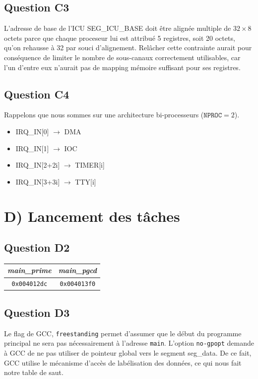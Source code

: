 \documentclass[10pt]{article}
\begin{document}
\subsection{Question C3}
L'adresse de base de l'ICU SEG\_ICU\_BASE doit être alignée multiple de $32
\times 8$ octets parce que chaque proceseur lui est attribué 5 registres, soit
20 octets, qu'on rehausse à 32 par souci d'alignement. Relâcher cette
contrainte aurait pour conséquence de limiter le nombre de sous-canaux
correctement utilisables, car l'un d'entre eux n'aurait pas de mapping mémoire
suffisant pour ses registres.

\subsection{Question C4}
Rappelons que nous sommes sur une architecture bi-processeurs ($\texttt{NPROC}
=2$).
\begin{itemize}
  \item IRQ\_IN[0] $\rightarrow$ DMA
  \item IRQ\_IN[1] $\rightarrow$ IOC
  \item IRQ\_IN[2+2i] $\rightarrow$ TIMER[i]
  \item IRQ\_IN[3+3i] $\rightarrow$ TTY[i]
\end{itemize}

\section{D) Lancement des tâches}

\subsection{Question D2}
\begin{center}
  \begin{tabular}{|c|c|}
    \hline
    {\it main\_prime} & {\it main\_pgcd} \\ \hline
    \texttt{0x004012dc} & \texttt{0x004013f0} \\ \hline
  \end{tabular}
\end{center}

\subsection{Question D3}
Le flag de GCC, \texttt{freestanding} permet d'assumer que le début du programme
principal ne sera pas nécessairement à l'adresse \texttt{main}. L'option
\texttt{no-gpopt} demande à GCC de ne pas utiliser de pointeur global vers le
segment seg\_data. De ce fait, GCC utilise le mécanisme d'accès de labélisation
des données, ce qui nous fait notre table de saut.
\end{document}
